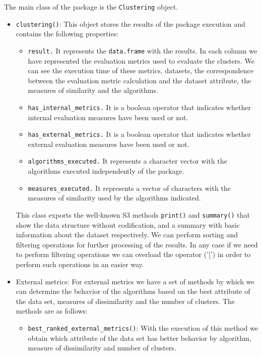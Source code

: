 The main class of the package is the \texttt{Clustering} object.
\begin{itemize}
    \item \texttt{clustering()}: This object stores the results of the  package execution and contains the following properties:
    \begin{itemize}
        \item \texttt{result.} It represents the \texttt{data.frame} with the results. In each column we have represented the evaluation metrics used to evaluate the clusters. We can see the execution time of these metrics, datasets, the correspondence between the evaluation metric calculation and the dataset attribute, the measures of similarity and the algorithms.
        \item \texttt{has\_internal\_metrics.} It is a boolean operator that indicates whether internal evaluation measures have been used or not.
        \item \texttt{has\_external\_metrics.} It is a boolean operator that indicates whether external evaluation measures have been used or not.
        \item \texttt{algorithms\_executed.} It represents a character vector with the algorithms executed independently of the package.
        \item \texttt{measures\_executed.} It represents a vector of characters with the measures of similarity used by the algorithms indicated.
    \end{itemize}
This class exports the well-known S3 methods \texttt{print()} and \texttt{summary()} that show the data structure without codification, and a summary with basic information about the dataset respectively. We can perform sorting and filtering operations for further processing of the results. In any case if we need to perform filtering operations we can overload the operator ('[') in order to perform such operations in an easier way.
    \item External metrics: For external metrics we have a set of methods by which we can determine the behavior of the algorithms based on the best attribute of the data set, measures of dissimilarity and the number of clusters. The methods are as follows:
    \begin{itemize}
      \item \texttt{best\_ranked\_external\_metrics()}: With the execution of this method we obtain which attribute of the data set has better behavior by algorithm, measure of dissimilarity and number of clusters.

\end{itemize}
\end{itemize}
